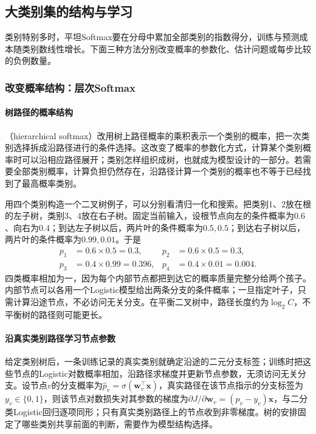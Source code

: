 \subsection{大类别集的结构与学习}
\label{sec:classification-large-category-set}

类别特别多时，平坦Softmax要在分母中累加全部类别的指数得分，训练与预测成本随类别数线性增长。下面三种方法分别改变概率的参数化、估计问题或每步比较的负例数量。

\subsubsection{改变概率结构：层次Softmax}

\paragraph{树路径的概率结构}
（hierarchical softmax）改用树上路径概率的乘积表示一个类别的概率，把一次类别选择拆成沿路径进行的条件选择。这改变了概率的参数化方式，计算某个类别概率时可以沿相应路径展开；类别怎样组织成树，也就成为模型设计的一部分。若需要全部类别概率，计算负担仍然存在，沿路径计算一个类别的概率也不等于已经找到了最高概率类别。

用四个类别构造一个二叉树例子，可以分别看清归一化和搜索。把类别1、2放在根的左子树，类别3、4放在右子树。固定当前输入，设根节点向左的条件概率为$0.6$、向右为$0.4$；到达左子树以后，两片叶的条件概率为$0.5,0.5$；到达右子树以后，两片叶的条件概率为$0.99,0.01$。于是
\[
  \begin{aligned}
    p_1&=0.6\times0.5=0.3,&
    p_2&=0.6\times0.5=0.3,\\
    p_3&=0.4\times0.99=0.396,&
    p_4&=0.4\times0.01=0.004.
  \end{aligned}
\]
四类概率相加为一，因为每个内部节点都把到达它的概率质量完整分给两个孩子。内部节点可以各用一个Logistic模型给出两条分支的条件概率；一旦指定叶子，只需计算沿途节点，不必访问无关分支。在平衡二叉树中，路径长度约为$\log_2C$，不平衡树的路径则可能更长。

\paragraph{沿真实类别路径学习节点参数}
给定类别树后，一条训练记录的真实类别就确定沿途的二元分支标签；训练时把这些节点的Logistic对数概率相加，沿路径求梯度并更新节点参数，无须访问无关分支。设节点$v$的分支概率为$\hat p_v=\sigma(\bm w_v^{\top}\bm x)$，真实路径在该节点指示的分支标签为$y_v\in\{0,1\}$，则该节点对数损失对其参数的梯度为$\partial J/\partial\bm w_v=(\hat p_v-y_v)\bm x$，与二分类Logistic回归逐项同形；只有真实类别路径上的节点收到非零梯度。树的安排固定了哪些类别共享前面的判断，需要作为模型结构选择。

